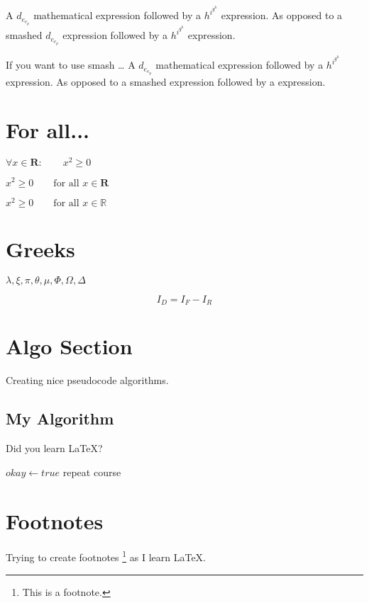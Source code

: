 \documentclass{article}
\begin{document}
A $d_{e_{e_p}}$ mathematical
expression  followed by a
$h^{i^{g^h}}$ expression. As
opposed to a smashed
{$d_{e_{e_p}}$} expression
followed by a {$h^{i^{g^h}}$} expression.\newline

\noindent If you want to use smash \ldots \newline
A $d_{e_{e_p}}$ mathematical
expression  followed by a
$h^{i^{g^h}}$ expression. As
opposed to a smashed
 expression
followed by a
 expression.

\section{For all...}

$\forall x \in \mathbf{R}:
 \qquad x^{2} \geq 0$

\bigskip
\noindent $x^{2} \geq 0\qquad
 \text{for all }x\in\mathbf{R}$

\bigskip
\noindent $x^{2} \geq 0\qquad
 \text{for all } x
 \in \mathbb{R}$

\section{Greeks}

$\lambda,\xi,\pi,\theta,
 \mu,\Phi,\Omega,\Delta$



\begin{equation}
I_D = I_F - I_R
\end{equation}

\section{Algo Section}

Creating nice pseudocode algorithms.

\subsection{My Algorithm}

Did you learn \LaTeX?

\begin{algorithmic}
	\State $okay \gets true$
\Else
		\State repeat course
	\EndWhile
\EndIf
\end{algorithmic}

\section{Footnotes}
Trying to create footnotes \footnote{This is a footnote.} as I learn \LaTeX.
\end{document}

